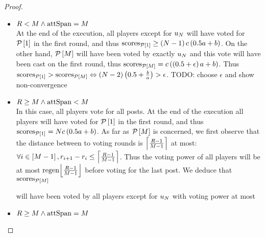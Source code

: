 \begin{proof}
\begin{itemize}
\begin{itemize}
      \item $\rounds < \postlen \wedge \attspan = \postlen$ \\
      At the end of the execution, all players except for $u_\playerlen$ will
      have voted for $\postlist\left[1\right]$ in the first round, and thus
      $\mathrm{scores}_{\postlist\left[1\right]} \geq \left(\playerlen -
      1\right) c \left(0.5a + b\right)$. On the other hand,
      $\postlist\left[\postlen\right]$ will have been voted by exactly
      $u_\playerlen$ and this vote will have been cast on the first round, thus
      $\mathrm{scores}_{\postlist\left[\postlen\right]} = c\left(\left(0.5 +
      \epsilon\right)a + b\right)$. Thus
      $\mathrm{scores}_{\postlist\left[1\right]} >
      \mathrm{scores}_{\postlist\left[\postlen\right]} \Leftrightarrow \left(N
      - 2\right)\left(0.5 + \frac{b}{a}\right) > \epsilon$. TODO: choose
      $\epsilon$ and show non-convergence

      \item $\rounds \geq \postlen \wedge \attspan < \postlen$ \\
      In this case, all players vote for all posts.  At the end of the execution
      all players will have voted for $\postlist\left[1\right]$ in the first
      round, and thus $\mathrm{scores}_{\postlist\left[1\right]} = \playerlen c
      \left(0.5a + b\right)$. As far as $\postlist\left[\postlen\right]$ is
      concerned, we first observe that the distance between to voting rounds is
      $\ceil*{\frac{\rounds - 1}{\postlen - 1}}$ at most: $\forall i \in
      \left[M - 1\right], r_{i+1} - r_i \leq \ceil*{\frac{\rounds - 1}{\postlen
      - 1}}$. Thus the voting power of all players will be at most
      $\regen\floor*{\frac{\rounds - 1}{\postlen - 1}}$ before voting for the
      last post. We deduce that
      $\mathrm{scores}_{\postlist\left[\postlen\right]}$
      
      will have
      been voted by all players except for $u_{\playerlen}$ with voting power at
      most

      \item $\rounds \geq \postlen \wedge \attspan = \postlen$ \\
    \end{itemize}


\end{itemize}
\end{proof}
